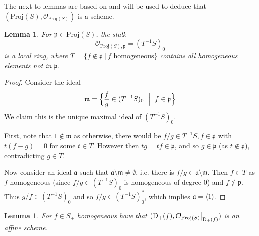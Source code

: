 \documentclass{scrartcl}
\newcommand{\D}[1]{\mathrm{D}_+(#1)}
\newcommand{\p}{\mathfrak{p}}
\newcommand{\m}{\mathfrak{m}}
\renewcommand{\a}{\mathfrak{a}}
\renewcommand{\m}{\mathfrak{m}}
\newcommand{\Proj}{\mathrm{Proj}}
\renewcommand{\O}{\mathcal{O}}
\newcommand\restr[2]{{
    \left.\kern-\nulldelimiterspace
    #1
    \vphantom{\big|}
    \right|_{#2}
}}
\newtheorem{lemma}[subsection]{Lemma}
\theoremstyle{definition}
\begin{document}
The next to lemmas are based on \cite[Prop. II.2.5]{hartshorne} and will be used to deduce that $(\Proj(S), \O_{\Proj(S)})$ is a scheme.
\begin{lemma}
    For $\p \in \Proj(S)$, the stalk
    \begin{equation*}
        \O_{\Proj(S), \p} = (T^{-1}S)_0
    \end{equation*}
    is a local ring, where $T = \{ f \notin \p \ | \ \text{$f$ homogeneous}\}$ contains all homogeneous elements not in $\p$.
\end{lemma}
\begin{proof}
    Consider the ideal
    \begin{equation*}
        \m = \Bigl\{ \frac f g \in (T^{-1}S)_0 \ \Bigm| \ f \in \p \Bigr\}
    \end{equation*}
    We claim this is the unique maximal ideal of $(T^{-1}S)_0$.

    First, note that $1 \notin \m$ as otherwise, there would be $f/g \in T^{-1}S, f \in \p$ with $t(f - g) = 0$ for some $t \in T$.
    However then $tg = tf \in \p$, and so $g \in \p$ (as $t \notin \p$), contradicting $g \in T$.
    
    Now consider an ideal $\a$ such that $\a \setminus \m \neq \emptyset$, i.e. there is $f/g \in \a \setminus \m$.
    Then $f \in T$ as $f$ homogeneous (since $f/g \in (T^{-1}S)_0$ is homogeneous of degree 0) and $f \notin \p$.
    Thus $g/f \in (T^{-1}S)_0$ and so $f/g \in (T^{-1}S)_0^*$, which implies $\a = \langle 1 \rangle$.
\end{proof}
\begin{lemma}
    \label{prop:Df_affine}
    For $f \in S_+$ homogeneous have that $(\D{f}, \restr{\O_{\Proj(S)}}{\D{f}})$ is an affine scheme.
\end{lemma}
\end{document}
